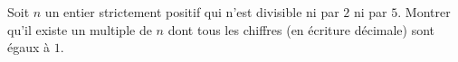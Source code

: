 Soit $n$ un entier strictement positif qui n'est divisible ni par $2$ ni par $5$. Montrer qu'il existe un multiple de $n$ dont tous les chiffres (en écriture décimale) sont égaux à $1$.
